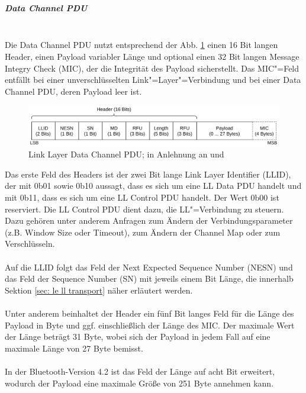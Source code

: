 \\\\
\subparagraph{Data Channel PDU} \mbox{} \vspace{0.2cm} \\
Die Data Channel PDU nutzt entsprechend der Abb. \ref{fig: ll data channel pdu} einen 16 Bit langen Header, einen Payload variabler Länge und optional einen 32 Bit langen Message Integry Check (MIC), der die Integrität des Payload sicherstellt. Das MIC"=Feld entfällt bei einer unverschlüsselten Link"=Layer"=Verbindung und bei einer Data Channel PDU, deren Payload leer ist.
\begin{figure}[H]
    \centering
    \includegraphics[width=1\textwidth]{graphics/link_layer_packetformat_pdu_data.pdf}
    \caption[Link Layer Data Channel PDU]{Link Layer Data Channel PDU; in Anlehnung an \cite{BtSpec_fig_2208a} und \cite{BtSpec_fig_2208b}}
    \label{fig: ll data channel pdu}
\end{figure}
Das erste Feld des Headers ist der zwei Bit lange Link Layer Identifier (LLID), der mit 0b01 sowie 0b10 aussagt, dass es sich um eine LL Data PDU handelt und mit 0b11, dass es sich um eine LL Control PDU handelt. Der Wert 0b00 ist reserviert. Die LL Control PDU dient dazu, die LL"=Verbindung zu steuern. Dazu gehören unter anderem Anfragen zum Ändern der Verbindungsparameter (z.B. Window Size oder Timeout), zum Ändern der Channel Map oder zum Verschlüsseln.
\\\\
Auf die LLID folgt das Feld der Next Expected Sequence Number (NESN) und das Feld der Sequence Number (SN) mit jeweils einem Bit Länge, die innerhalb Sektion \ref{sec: le ll transport} näher erläutert werden.
\\\\
Unter anderem beinhaltet der Header ein fünf Bit langes Feld für die Länge des Payload in Byte und ggf. einschließlich der Länge des MIC. Der maximale Wert der Länge beträgt 31 Byte, wobei sich der Payload in jedem Fall auf eine maximale Länge von 27 Byte bemisst. \cite{BtSpec4.0_2208-2209}
\\\\
In der Bluetooth-Version 4.2 ist das Feld der Länge auf acht Bit erweitert, wodurch der Payload eine maximale Größe von 251 Byte annehmen kann. \cite{BtSpec4.2_2589-2590}